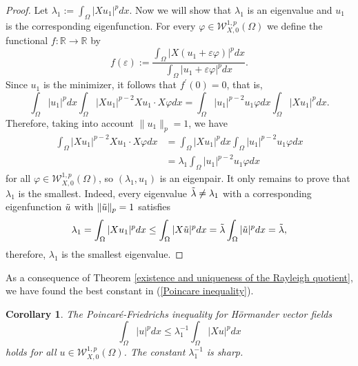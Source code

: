 \documentclass[a4paper,12pt,reqno]{amsart}
\renewcommand\eqref[1]{(\ref{#1})} %
\numberwithin{equation}{section}
\theoremstyle{plain}
\newtheorem{corollary}[theorem]{Corollary}
\theoremstyle{definition}
\begin{document}
\begin{proof}
Let $\lambda_1:=\int_{\Omega}|X u_1|^{p} d x$. Now we will show that  $\lambda_{1}$ is an eigenvalue and $u_{1}$ is the corresponding eigenfunction. For every $\varphi\in \mathcal{W}_{X,0}^{1, p}(\Omega)$  we define the functional  $f:\mathbb{R}\to \mathbb{R}$ by
\begin{equation*}
f(\varepsilon):=\frac{\int_{\Omega}|X(u_{1}+\varepsilon \varphi)|^{p} d x}{\int_{\Omega}|u_{1}+\varepsilon \varphi|^{p} d x}.
\end{equation*}
Since $u_{1}$ is the minimizer,
it follows that  $f^{\prime}(0)=0$, that is,
\begin{equation*}
\int_{\Omega}|u_{1}|^{p} d x \int_{\Omega}|X u_{1}|^{p-2} X u_{1} \cdot X \varphi d x=\int_{\Omega}|u_{1}|^{p-2} u_{1} \varphi d x \int_{\Omega}|X u_{1}|^{p} d x.
\end{equation*}
Therefore, taking into account $\|u_{1}\|_{p}=1$, we have
\begin{equation*}
\begin{aligned}
\int_{\Omega}|X u_{1}|^{p-2} X u_{1} \cdot X \varphi d x &= \int_{\Omega}|X u_{1}|^{p} d x \int_{\Omega}|u_{1}|^{p-2} u_{1} \varphi dx\\
&=\lambda_{1} \int_{\Omega}|u_{1}|^{p-2} u_{1} \varphi d x
\end{aligned}
\end{equation*}
for all $\varphi\in \mathcal{W}_{X,0}^{1, p}(\Omega)$, so $(\lambda_{1}, u_{1})$ is an eigenpair. It only remains to prove that $\lambda_{1}$ is the smallest. Indeed, every eigenvalue $\Tilde{\lambda}\neq\lambda_{1}$ with a corresponding eigenfunction $\Tilde{u}$ with $\|\Tilde{u}\|_{p}=1$ satisfies
\begin{equation*}
\lambda_{1}=\int_{\Omega}|X u_{1}|^p d x\leq \int_{\Omega}|X \Tilde{u}|^p d x=\Tilde{\lambda} \int_{\Omega} |\Tilde{u}|^{p}d x=\Tilde{\lambda},
\end{equation*}
therefore, $\lambda_{1}$ is the smallest eigenvalue.
\end{proof}
As a consequence of Theorem \ref{existence and uniqueness of the Rayleigh quotient}, we have found the best constant in \eqref{Poincare inequality}.
\begin{corollary}\label{the best constant of Poincare}
The Poincar\'e-Friedrichs inequality for H\"ormander vector fields
\begin{equation*}
\int_{\Omega}|u|^{p} d x\leq \lambda_{1}^{-1} \int_{\Omega}|X u|^{p} d x 
\end{equation*}
holds for all $u\in \mathcal{W}_{X,0}^{1, p}(\Omega)$. The constant $\lambda_{1}^{-1}$ is sharp.
\end{corollary}
\end{document}
